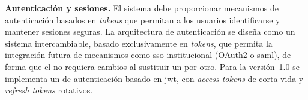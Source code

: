 
\item \textbf{Autenticación y sesiones.} \label{rf:auth}
El sistema debe proporcionar mecanismos de autenticación basados en \textit{tokens} que
permitan a los usuarios identificarse y mantener sesiones seguras. La arquitectura de
autenticación se diseña como un sistema  intercambiable, basado exclusivamente
en \textit{tokens}, que permita la integración futura de mecanismos como \ac{sso}
institucional (OAuth2 o \acs{saml}), de forma que el  no requiera cambios
al sustituir un  por otro. Para la versión~1.0 se implementa un 
de autenticación basado en \ac{jwt}, con \textit{access tokens} de corta vida y
\textit{refresh tokens} rotativos.

